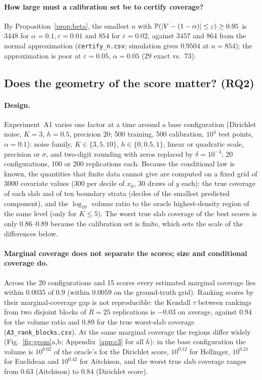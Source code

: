 \paragraph{How large must a calibration set be to certify coverage?}
By Proposition~\ref{prop:beta}, the smallest $n$ with $\mathbb{P}(|V-(1-\alpha)|\le\varepsilon)\ge0.95$ is $3448$ for $\alpha=0.1,\varepsilon=0.01$ and $854$ for $\varepsilon=0.02$, against $3457$ and $864$ from the normal approximation (\texttt{certify\_n.csv}; simulation gives $0.9504$ at $n=854$); the approximation is poor at $\varepsilon=0.05$, $\alpha=0.05$ ($29$ exact vs.\ $73$).

\subsection{Does the geometry of the score matter? (RQ2)}
\label{sec:exp_geom}
\paragraph{Design.}
Experiment~A1 varies one factor at a time around a base configuration (Dirichlet noise, $K=3$, $h=0.5$, precision $20$; 500 training, 500 calibration, $10^4$ test points, $\alpha=0.1$): noise family, $K\in\{3,5,10\}$, $h\in\{0,0.5,1\}$, linear or quadratic scale, precision or $\sigma$, and two-digit rounding with zeros replaced by $\delta=10^{-4}$; 20 configurations, 100 or 200 replications each.
Because the conditional law is known, the quantities that finite data cannot give are computed on a fixed grid of 3000 covariate values (300 per decile of $x_0$, 30 draws of $y$ each): the true coverage of each slab and of ten boundary strata (deciles of the smallest predicted component), and the $\log_{10}$ volume ratio to the oracle highest-density region of the same level (only for $K\le5$).
The worst true slab coverage of the best scores is only $0.86$--$0.89$ because the calibration set is finite, which sets the scale of the differences below.

\paragraph{Marginal coverage does not separate the scores; size and conditional coverage do.}
Across the 20 configurations and 15 scores every estimated marginal coverage lies within $0.0035$ of $0.9$ (within $0.0059$ on the ground-truth grid).
Ranking scores by their marginal-coverage gap is not reproducible: the Kendall $\tau$ between rankings from two disjoint blocks of $R=25$ replications is $-0.03$ on average, against $0.94$ for the volume ratio and $0.89$ for the true worst-slab coverage (\texttt{A3\_rank\_blocks.csv}).
At the same marginal coverage the regions differ widely (Fig.~\ref{fig:geom}a,b; Appendix~\ref{app:c3} for all $h$): in the base configuration the volume is $10^{0.02}$ of the oracle's for the Dirichlet score, $10^{0.12}$ for Hellinger, $10^{0.21}$ for Euclidean and $10^{0.42}$ for Aitchison, and the worst true slab coverage ranges from $0.63$ (Aitchison) to $0.84$ (Dirichlet score).

